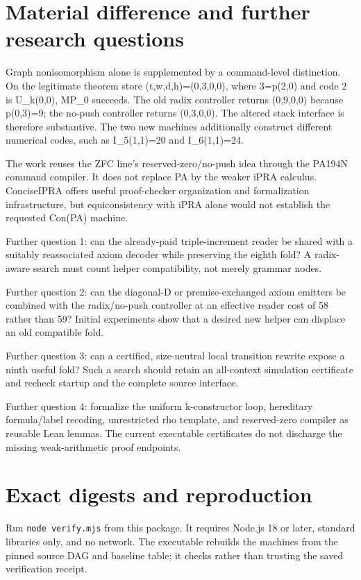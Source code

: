\documentclass[11pt,letterpaper]{article}
\begin{document}
\section{Material difference and further research questions}
Graph nonisomorphism alone is supplemented by a command-level distinction. On the legitimate theorem store (t,w,d,h)=(0,3,0,0), where 3=p(2,0) and code 2 is U\_k(0,0), MP\_0 succeeds. The old radix controller returns (0,9,0,0) because p(0,3)=9; the no-push controller returns (0,3,0,0). The altered stack interface is therefore substantive. The two new machines additionally construct different numerical codes, such as I\_5(1,1)=20 and I\_6(1,1)=24.

The work reuses the ZFC line's reserved-zero/no-push idea through the PA194N command compiler. It does not replace PA by the weaker iPRA calculus. ConciseIPRA offers useful proof-checker organization and formalization infrastructure, but equiconsistency with iPRA alone would not establish the requested Con(PA) machine.

Further question 1: can the already-paid triple-increment reader be shared with a suitably reassociated axiom decoder while preserving the eighth fold? A radix-aware search must count helper compatibility, not merely grammar nodes.

Further question 2: can the diagonal-D or premise-exchanged axiom emitters be combined with the radix/no-push controller at an effective reader cost of 58 rather than 59? Initial experiments show that a desired new helper can displace an old compatible fold.

Further question 3: can a certified, size-neutral local transition rewrite expose a ninth useful fold? Such a search should retain an all-context simulation certificate and recheck startup and the complete source interface.

Further question 4: formalize the uniform k-constructor loop, hereditary formula/label recoding, unrestricted rho template, and reserved-zero compiler as reusable Lean lemmas. The current executable certificates do not discharge the missing weak-arithmetic proof endpoints.

\section{Exact digests and reproduction}
Run \texttt{node verify.mjs} from this package. It requires Node.js 18 or
later, standard libraries only, and no network. The executable rebuilds
the machines from the pinned source DAG and baseline table; it checks
rather than trusting the saved verification receipt.
\end{document}
